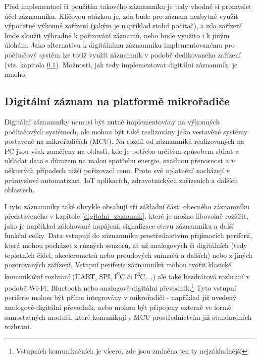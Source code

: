 Před implementací či použitím takového záznamníku je tedy vhodné si promyslet účel záznamníku. Klíčovou otázkou je, zda bude pro záznam nezbytné využít výpočetně výkonné zařízení (jakým je například stolní počítač), a zda zařízení bude sloužit výhradně k pořizování záznamů, nebo bude využito i k jiným úlohám. Jako alternativu k digitálnímu záznamníku implementovanému pro počítačový systém lze totiž využít záznamník v podobě dedikovaného zařízení (viz. kapitola \ref{digitalni_zaznamnik_mikroradic}). Možností, jak tedy implementovat digitální záznamník, je mnoho.


\subsection{Digitální záznam na platformě mikrořadiče}
\label{digitalni_zaznamnik_mikroradic}
Digitální záznamníky nemusí být nutně implementovány na výkonných počítačových systémech, ale mohou být také realizovány jako vestavěné systémy postavené na mikrořadičích (MCU). Na rozdíl od záznamníků realizovaných na PC jsou však zaměřeny na oblasti, kde je potřeba určitým způsobem sbírat a ukládat data s důrazem na malou spotřebu energie, snadnou přenosnost a v některých případech nižší pořizovací cenu. Proto své uplatnění nacházejí v průmyslové automatizaci, IoT aplikacích, zdravotnických zařízeních a dalších oblastech. \cite{cas_industrial_dataloggers, madgetech_dataloggers_healthcare, springer_industry_monitoring, springer_healthcare_iot_monitoring}

I tyto záznamníky také obvykle obsahují tři základní části obecného záznamníku představeného v kapitole \ref{digitalni_zaznamik}, které je možno libovolně rozšířit, jako je například zálohované napájení, signalizace stavu záznamníku a další funkční celky. Data vstupují do záznamníku prostřednictvím přijímacích periferií, která mohou pocházet z různých senzorů, ať už analogových či digitálních (tedy teplotních čidel, akcelerometrů nebo proudových snímačů a dalších) nebo z jiných pozorovaných zařízení. Vstupní periferie záznamníků mohou tvořit klasické komunikační rozhraní (UART, SPI, I\textsuperscript{2}C či I\textsuperscript{3}C,...) ale také bezdrátová rozhraní v podobě Wi-Fi, Bluetooth nebo analogově-digitální převodník.\footnote{Vstupních komunikačních je vícero, zde jsou zmíněna jen ty nejzákladnější} Tyto vstupní periferie mohou být přímo integrovány v mikrořadiči - například již uvedený analogově-digitální převodník, nebo mohou být připojeny externě ve formě samostatných modulů, které komunikují s MCU prostřednictvím již standardních rozhraní.

